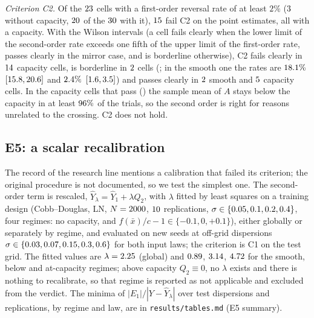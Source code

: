 \documentclass[10pt,a4paper]{article}
\theoremstyle{plain}
\theoremstyle{definition}
\theoremstyle{remark}
\newcommand{\Yh}{\widehat{Y}}
\begin{document}
\emph{Criterion C2.} Of the $23$ cells with a first-order reversal rate of at least $2\%$ ($3$ without capacity, $20$ of the $30$ with it), $15$ fail C2 on the point estimates, all with a capacity. With the Wilson intervals (a cell fails clearly when the lower limit of the second-order rate exceeds one fifth of the upper limit of the first-order rate, passes clearly in the mirror case, and is borderline otherwise), C2 fails clearly in $14$ capacity cells, is borderline in $2$ cells (\EfourBorderlineCellsText; in the smooth one the rates are $18.1\%$ $[15.8, 20.6]$ and $2.4\%$ $[1.6, 3.5]$) and passes clearly in $2$ smooth and $5$ capacity cells. In the capacity cells that pass (\EfourPassingCellsText) the sample mean of $A$ stays below the capacity in at least $96\%$ of the trials, so the second order is right for reasons unrelated to the crossing. C2 does not hold.

\subsection{E5: a scalar recalibration}

The record of the research line mentions a calibration that failed its criterion; the original procedure is not documented, so we test the simplest one. The second-order term is rescaled, $\Yh_\lambda=\Yh_1+\lambda Q_2$, with $\lambda$ fitted by least squares on a training design (Cobb--Douglas, LN, $N=2000$, $10$ replications, $\sigma\in\{0.05, 0.1, 0.2, 0.4\}$, four regimes: no capacity, and $f(\bar x)/c-1\in\{-0.1,0,+0.1\}$), either globally or separately by regime, and evaluated on new seeds at off-grid dispersions $\sigma\in\{0.03, 0.07, 0.15, 0.3, 0.6\}$ for both input laws; the criterion is C1 on the test grid. The fitted values are $\lambda=2.25$ (global) and $0.89$, $3.14$, $4.72$ for the smooth, below and at-capacity regimes; above capacity $Q_2\equiv0$, no $\lambda$ exists and there is nothing to recalibrate, so that regime is reported as not applicable and excluded from the verdict. The minima of $|E_1|/|Y-\Yh_\lambda|$ over test dispersions and replications, by regime and law, are in \texttt{results/tables.md} (E5 summary).
\end{document}
